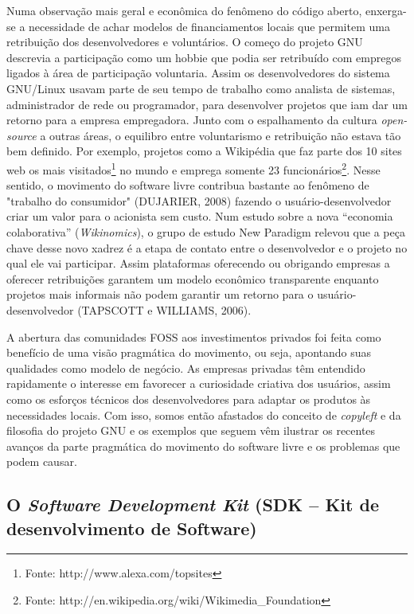 Numa observação mais geral e econômica do fenômeno do código aberto, enxerga-se a necessidade de achar modelos de financiamentos locais que permitem uma retribuição dos desenvolvedores e voluntários. O começo do projeto GNU descrevia a participação como um hobbie que podia ser retribuído com empregos ligados à área de participação voluntaria. Assim os desenvolvedores do sistema GNU/Linux usavam parte de seu tempo de trabalho como analista de sistemas, administrador de rede ou programador, para desenvolver projetos que iam dar um retorno para a empresa empregadora. Junto com o espalhamento da cultura \emph{open-source} a outras áreas, o equilibro entre voluntarismo e retribuição não estava tão bem definido. Por exemplo, projetos como a Wikipédia que faz parte dos 10 sites web os mais visitados\footnote{Fonte: http://www.alexa.com/topsites} no mundo e emprega somente 23 funcionários\footnote{Fonte: http://en.wikipedia.org/wiki/Wikimedia\_Foundation}. Nesse sentido, o movimento do software livre contribua bastante ao fenômeno de "trabalho do consumidor" (DUJARIER, 2008) fazendo o usuário-desenvolvedor criar um valor para o acionista sem custo. Num estudo sobre a nova “economia colaborativa” (\emph{Wikinomics}), o grupo de estudo New Paradigm relevou que a peça chave desse novo xadrez é a etapa de contato entre o desenvolvedor e o projeto no qual ele vai participar. Assim plataformas oferecendo ou obrigando empresas a oferecer retribuições garantem um modelo econômico transparente enquanto projetos mais informais não podem garantir um retorno para o usuário-desenvolvedor (TAPSCOTT e WILLIAMS, 2006).

A abertura das comunidades FOSS aos investimentos privados foi feita como benefício de uma visão pragmática do movimento, ou seja, apontando suas qualidades como modelo de negócio. As empresas privadas têm entendido rapidamente o interesse em favorecer a curiosidade criativa dos usuários, assim como os esforços técnicos dos desenvolvedores para adaptar os produtos às necessidades locais. Com isso, somos então afastados do conceito de \emph{copyleft} e da filosofia do projeto GNU e os exemplos que seguem vêm ilustrar os recentes avanços da parte pragmática do movimento do software livre e os problemas que podem causar. 

\subsection{O \emph{Software Development Kit} (SDK – Kit de desenvolvimento de Software)} \label{1.4.1}

